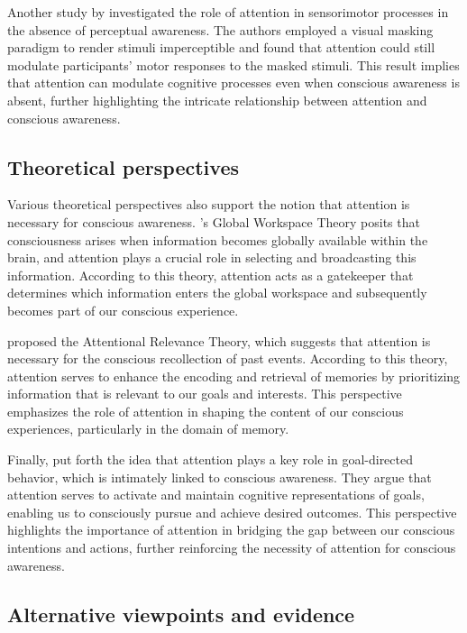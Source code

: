 \documentclass[10pt]{article}
\begin{document}
\begin{sloppypar}
  Another study by \cite{sumner_attentional_2006} investigated the role of attention in sensorimotor processes in the absence of perceptual awareness. The authors employed a visual masking paradigm to render stimuli imperceptible and found that attention could still modulate participants' motor responses to the masked stimuli. This result implies that attention can modulate cognitive processes even when conscious awareness is absent, further highlighting the intricate relationship between attention and conscious awareness.

  \subsection{Theoretical perspectives}
  \label{sec:theoretical}

  Various theoretical perspectives also support the notion that attention is necessary for conscious awareness. \cite{baars_essential_1997}'s Global Workspace Theory posits that consciousness arises when information becomes globally available within the brain, and attention plays a crucial role in selecting and broadcasting this information. According to this theory, attention acts as a gatekeeper that determines which information enters the global workspace and subsequently becomes part of our conscious experience.

  \cite{de_brigard_role_2012} proposed the Attentional Relevance Theory, which suggests that attention is necessary for the conscious recollection of past events. According to this theory, attention serves to enhance the encoding and retrieval of memories by prioritizing information that is relevant to our goals and interests. This perspective emphasizes the role of attention in shaping the content of our conscious experiences, particularly in the domain of memory.

  Finally, \cite{dijksterhuis_goals_2010} put forth the idea that attention plays a key role in goal-directed behavior, which is intimately linked to conscious awareness. They argue that attention serves to activate and maintain cognitive representations of goals, enabling us to consciously pursue and achieve desired outcomes. This perspective highlights the importance of attention in bridging the gap between our conscious intentions and actions, further reinforcing the necessity of attention for conscious awareness.

  \subsection{Alternative viewpoints and evidence}
  \label{sec:alternative}


\end{sloppypar}
\end{document}
